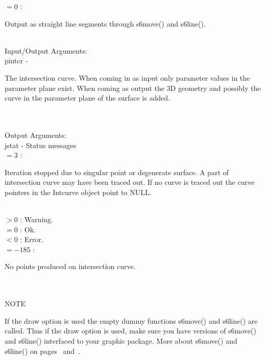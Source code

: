                     \>\>\>\>\> $= 0$ \> : \begin{minipg5}
                                             Output as straight line
                                             segments through s6move()
                                             and s6line().
                                          \end{minipg5}\\[0.8ex]
\newpagetabs
        \>Input/Output Arguments:\\
        \>\>    {\fov pintcr}\> - \>  \begin{minipg2}
                     The intersection curve. When coming in as input
                       only parameter values in the parameter plane
                       exist. When coming as output the 3D geometry
                       and possibly the curve in the parameter plane
                       of the surface is added.
                               \end{minipg2}\\[0.8ex]
\\
        \>Output Arguments:\\
        \>\>    {\fov jstat}     \> - \> Status messages\\
        \>\>\>\> $= 3$ \> :
                \begin{minipg5}
                  Iteration stopped due to singular
                  point or degenerate surface. A part
                  of intersection curve may have been
                  traced out. If no curve is traced out
                  the curve pointers in the Intcurve
                  object point to NULL.
                \end{minipg5}\\[0.8ex]
        \>\>\>\> $> 0$ \>\> : Warning.\\
        \>\>\>\> $= 0$ \>\> : Ok.\\
        \>\>\>\> $< 0$ \>\> : Error.\\
        \>\>\>\> $= -185$ \>\> :
        \begin{minipg5}
          No points produced on intersection curve.
        \end{minipg5}\\[0.8ex]
\\
NOTE\\
\>      \begin{minipg6}
If the draw option is used the empty dummy functions s6move() and
s6line() are called.
Thus if the draw option is used, make sure
you have versions of s6move() and s6line() interfaced to your graphic package.
More about s6move() and s6line() on pages~\pageref{s6move}
and~\pageref{s6line}.
\end{minipg6}\\
